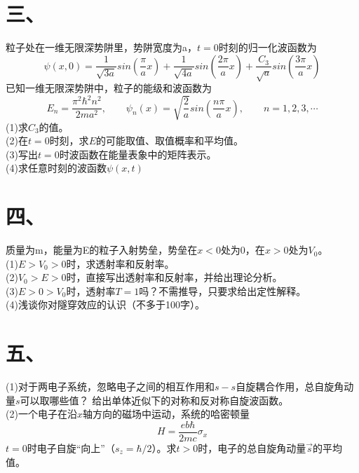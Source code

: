 \documentclass[UTF8]{ctexart}
\begin{document}
\section*{三、}
粒子处在一维无限深势阱里，势阱宽度为a，$t=0$时刻的归一化波函数为\[
  \psi(x,0)=\frac{1}{\sqrt{3a}}sin(\frac{\pi}{a}x)+\frac{1}{\sqrt{4a}}sin(\frac{2\pi}{a}x)+
  \frac{C_3}{\sqrt{a}}sin(\frac{3\pi}{a}x)
\]已知一维无限深势阱中，粒子的能级和波函数为\[
  E_n=\frac{\pi^2\hbar^2n^2}{2ma^2},
  \quad\quad \psi_n (x)=\sqrt{\frac{2}{a}}sin(\frac{n\pi}{a}x),\quad\quad
  n = 1,2,3,\cdots
\]
(1)求$C_3$的值。\\
(2)在$t=0$时刻，求$E$的可能取值、取值概率和平均值。\\
(3)写出$t=0$时波函数在能量表象中的矩阵表示。\\
(4)求任意时刻的波函数$\psi(x,t)$\\
\section*{四、}
质量为m，能量为E的粒子入射势垒，势垒在$x<0$处为0，在$x>0$处为$V_0$。\\
(1)$E>V_0>0$时，求透射率和反射率。\\
(2)$V_0>E>0$时，直接写出透射率和反射率，并给出理论分析。\\
(3)$E>0>V_0$时，透射率$T=1$吗？不需推导，只要求给出定性解释。\\
(4)浅谈你对隧穿效应的认识（不多于100字）。\\
\section*{五、}
 (1)对于两电子系统，忽略电子之间的相互作用和$s-s$自旋耦合作用，总自旋角动量$s$可以取哪些值？
给出单体近似下的对称和反对称自旋波函数。\\
(2)一个电子在沿$x$轴方向的磁场中运动，系统的哈密顿量\[
  H=\frac{eb\hbar}{2mc}\sigma_x\]
$t=0$时电子自旋“向上”（$s_z=\hbar/2$）。求$t>0$时，电子的总自旋角动量$\vec{s}$的平均值。
\end{document}
